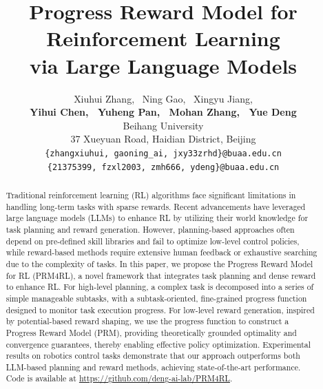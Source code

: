 \documentclass{article}
\title{Progress Reward Model for Reinforcement Learning \\via Large Language Models}
\author{%
  Xiuhui Zhang, \ Ning Gao, \ Xingyu Jiang, \\
  \textbf{Yihui Chen, \ Yuheng Pan, \ Mohan Zhang, \ Yue Deng} \\[1ex]
  Beihang University \\
  37 Xueyuan Road, Haidian District, Beijing \\
  \texttt{\{zhangxiuhui, gaoning\_ai, jxy33zrhd\}@buaa.edu.cn} \\
  \texttt{\{21375399, fzxl2003, zmh666, ydeng\}@buaa.edu.cn}
}
\theoremstyle{plain}
\begin{document}
\maketitle

\begin{abstract}
Traditional reinforcement learning (RL) algorithms face significant limitations in handling long-term tasks with sparse rewards.
Recent advancements have leveraged large language models (LLMs) to enhance RL by utilizing their world knowledge for task planning and reward generation.
However, planning-based approaches often depend on pre-defined skill libraries and fail to optimize low-level control policies, while reward-based methods require extensive human feedback or exhaustive searching due to the complexity of tasks.
In this paper, we propose the Progress Reward Model for RL (PRM4RL), a novel framework that integrates task planning and dense reward to enhance RL.
For high-level planning, a complex task is decomposed into a series of simple manageable subtasks, with a subtask-oriented, fine-grained progress function designed to monitor task execution progress.
For low-level reward generation, inspired by potential-based reward shaping, we use the progress function to construct a Progress Reward Model (PRM), providing theoretically grounded optimality and convergence guarantees, thereby enabling effective policy optimization.
Experimental results on robotics control tasks demonstrate that our approach outperforms both LLM-based planning and reward methods, achieving state-of-the-art performance.
Code is available at \url{https://github.com/deng-ai-lab/PRM4RL}.
\end{abstract}











\clearpage
\appendix

\end{document}
